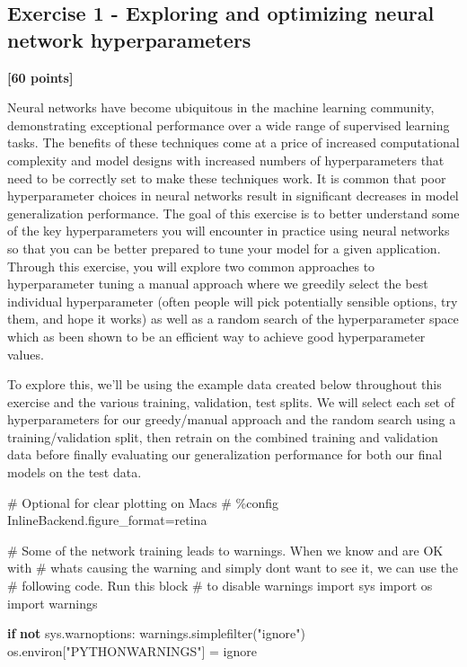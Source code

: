 \documentclass[
  letterpaper,
  DIV=11,
  numbers=noendperiod]{scrartcl}
\newenvironment{Shaded}{\begin{snugshade}}{\end{snugshade}}
\newcommand{\CommentTok}[1]{\textcolor[rgb]{0.37,0.37,0.37}{#1}}
\newcommand{\ControlFlowTok}[1]{\textcolor[rgb]{0.00,0.23,0.31}{\textbf{#1}}}
\newcommand{\ImportTok}[1]{\textcolor[rgb]{0.00,0.46,0.62}{#1}}
\newcommand{\KeywordTok}[1]{\textcolor[rgb]{0.00,0.23,0.31}{\textbf{#1}}}
\newcommand{\NormalTok}[1]{\textcolor[rgb]{0.00,0.23,0.31}{#1}}
\newcommand{\OperatorTok}[1]{\textcolor[rgb]{0.37,0.37,0.37}{#1}}
\newcommand{\StringTok}[1]{\textcolor[rgb]{0.13,0.47,0.30}{#1}}
\begin{document}
\subsection{Exercise 1 - Exploring and optimizing neural network
hyperparameters}\label{exercise-1---exploring-and-optimizing-neural-network-hyperparameters}

\textbf{{[}60 points{]}}

Neural networks have become ubiquitous in the machine learning
community, demonstrating exceptional performance over a wide range of
supervised learning tasks. The benefits of these techniques come at a
price of increased computational complexity and model designs with
increased numbers of hyperparameters that need to be correctly set to
make these techniques work. It is common that poor hyperparameter
choices in neural networks result in significant decreases in model
generalization performance. The goal of this exercise is to better
understand some of the key hyperparameters you will encounter in
practice using neural networks so that you can be better prepared to
tune your model for a given application. Through this exercise, you will
explore two common approaches to hyperparameter tuning a manual approach
where we greedily select the best individual hyperparameter (often
people will pick potentially sensible options, try them, and hope it
works) as well as a random search of the hyperparameter space which as
been shown to be an efficient way to achieve good hyperparameter values.

To explore this, we'll be using the example data created below
throughout this exercise and the various training, validation, test
splits. We will select each set of hyperparameters for our greedy/manual
approach and the random search using a training/validation split, then
retrain on the combined training and validation data before finally
evaluating our generalization performance for both our final models on
the test data.

\begin{Shaded}
\begin{Highlighting}[]
\CommentTok{\# Optional for clear plotting on Macs}
\CommentTok{\# \%config InlineBackend.figure\_format=\textquotesingle{}retina\textquotesingle{}}

\CommentTok{\# Some of the network training leads to warnings. When we know and are OK with }
\CommentTok{\#  what\textquotesingle{}s causing the warning and simply don\textquotesingle{}t want to see it, we can use the }
\CommentTok{\#  following code. Run this block}
\CommentTok{\#  to disable warnings}
\ImportTok{import}\NormalTok{ sys}
\ImportTok{import}\NormalTok{ os}
\ImportTok{import}\NormalTok{ warnings}

\ControlFlowTok{if} \KeywordTok{not}\NormalTok{ sys.warnoptions:}
\NormalTok{    warnings.simplefilter(}\StringTok{"ignore"}\NormalTok{)}
\NormalTok{    os.environ[}\StringTok{"PYTHONWARNINGS"}\NormalTok{] }\OperatorTok{=} \StringTok{\textquotesingle{}ignore\textquotesingle{}}
\end{Highlighting}
\end{Shaded}
\end{document}
